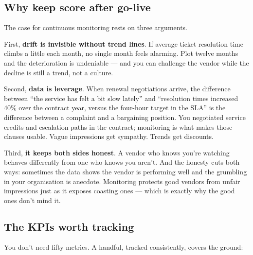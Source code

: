 \subsection{Why keep score after go-live}


The case for continuous monitoring rests on three arguments.


First, \textbf{drift is invisible without trend lines}. If average ticket resolution time climbs a little each month, no single month feels alarming. Plot twelve months and the deterioration is undeniable — and you can challenge the vendor while the decline is still a trend, not a culture.


Second, \textbf{data is leverage}. When renewal negotiations arrive, the difference between ``the service has felt a bit slow lately'' and ``resolution times increased 40\% over the contract year, versus the four-hour target in the SLA'' is the difference between a complaint and a bargaining position. You negotiated service credits and escalation paths in the contract; monitoring is what makes those clauses usable. Vague impressions get sympathy. Trends get discounts.


Third, \textbf{it keeps both sides honest}. A vendor who knows you're watching behaves differently from one who knows you aren't. And the honesty cuts both ways: sometimes the data shows the vendor is performing well and the grumbling in your organisation is anecdote. Monitoring protects good vendors from unfair impressions just as it exposes coasting ones — which is exactly why the good ones don't mind it.



\subsection{The KPIs worth tracking}


You don't need fifty metrics. A handful, tracked consistently, covers the ground:


